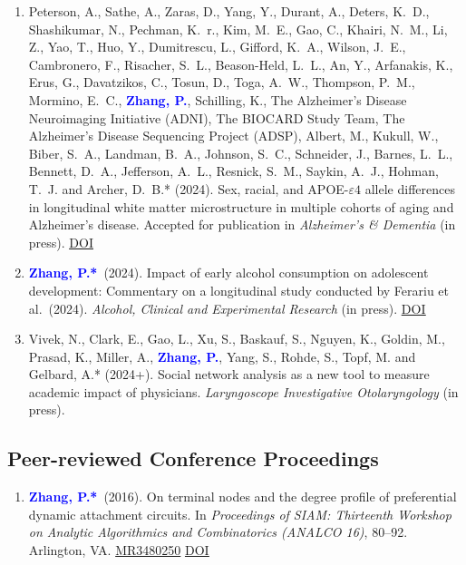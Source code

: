 \documentclass[12pt]{article}
\def \MR #1{\href{http://www.ams.org/mathscinet-getitem?mr=#1}{MR#1}}
\def \DOI #1{\href{http://doi.org/#1}{\underline{DOI}}}
\newcommand{\PZ}{\textcolor{blue}{\textbf{Zhang, P.*}}}
\newcommand{\PZnot}{\textcolor{blue}{\textbf{Zhang, P.}}}
\begin{document}
\begin{enumerate}
		\item {\sc Peterson, A., Sathe, A., Zaras, D., Yang, Y.,  
		Durant, A., Deters, K.\ D., Shashikumar, N., Pechman, K.\ 
		r., Kim, M.\ E., Gao, C., Khairi, N.\ M., Li, Z., Yao, T., 
		Huo, Y., Dumitrescu, L., Gifford, K.\ A., Wilson, J.\ E., 
		Cambronero, F., Risacher, S.\ L., Beason-Held, L.\ L., An, 
		Y., Arfanakis, K., Erus, G., Davatzikos, C., Tosun, D., 
		Toga, A.\ W., Thompson, P.\ M.,  Mormino, E.\ C.,} \PZnot, 
		{\sc Schilling, K., The Alzheimer’s Disease Neuroimaging 
		Initiative (ADNI), The BIOCARD Study Team, The Alzheimer’s 
		Disease Sequencing Project (ADSP), Albert, M., Kukull, W., 
		Biber, S.\ A., Landman, B.\ A., Johnson, S.\ C., Schneider, 
		J., Barnes, L.\ L., Bennett, D.\ A., Jefferson, A.\ L., 
		Resnick, S.\ M., Saykin, A.\ J., Hohman, T.\ J.} and {\sc 
		Archer, D.\ B.*} (2024). Sex, racial, and APOE-$\varepsilon 
		4$ allele differences in longitudinal white matter 
		microstructure in multiple cohorts of aging and Alzheimer’s 
		disease. Accepted for publication in {\em Alzheimer's \& 
		Dementia} (in press). \DOI{10.1002/alz.14343}  
		
		\item \PZ\ (2024). Impact of early alcohol consumption on 
		adolescent development: Commentary on a longitudinal study 
		conducted by Ferariu et al.\ (2024). {\em Alcohol, Clinical 
		and Experimental Research} (in press). 
		\DOI{10.1111/acer.15497}  
		
		\item {\sc Vivek, N., Clark, E., Gao, L., Xu, S., Baskauf, 
		S., Nguyen, K., Goldin, M., Prasad, K., Miller, A.,} \PZnot, 
		{\sc Yang, S., Rohde, S., Topf, M.} and {\sc Gelbard, A.*} 
		(2024+). Social network analysis as a new tool to measure 
		academic impact of physicians. {\em 
		Laryngoscope Investigative Otolaryngology} (in press).
\end{enumerate} 
	
	\subsection*{Peer-reviewed Conference Proceedings}
	\begin{enumerate}
		\item \PZ\ (2016). On terminal nodes and the degree 
		profile of preferential dynamic attachment circuits. In 
		\emph{Proceedings of SIAM: Thirteenth Workshop on Analytic 
		Algorithmics and Combinatorics (ANALCO 16)}, 80--92. 
		Arlington, VA. \MR{3480250} \DOI{10.1137/1.9781611974324.9}
	\end{enumerate}
	
\end{document}
